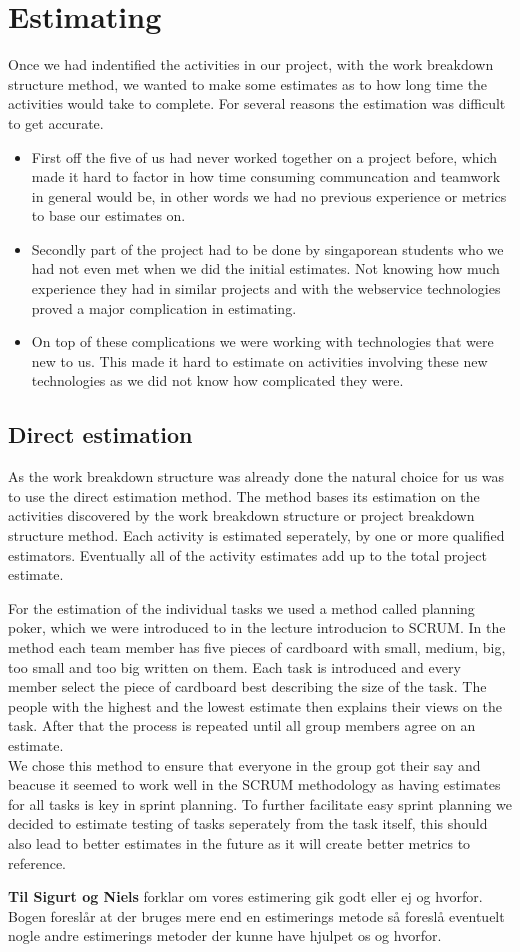 \section{Estimating}
Once we had indentified the activities in our project, with the work breakdown structure method, we wanted to make some estimates as to how long time the activities would take to complete. For several reasons the estimation was difficult to get accurate.
\begin{itemize}
\item First off the five of us had never worked together on a project before, which made it hard to factor in how time consuming communcation and teamwork in general would be, in other words we had no previous experience or metrics to base our estimates on. 

\item Secondly part of the project had to be done by singaporean students who we had not even met when we did the initial estimates. Not knowing how much experience they had in similar projects and with the webservice technologies proved a major complication in estimating.

\item  On top of these complications we were working with technologies that were new to us. This made it hard to estimate on activities involving these new technologies as we did not know how complicated they were.

\end{itemize}
\subsection{Direct estimation}
As the work breakdown structure was already done the natural choice for us was to use the direct estimation method\cite{caye}. The method bases its estimation on the activities discovered by the work breakdown structure or project breakdown structure method. Each activity is  estimated seperately, by one or more qualified estimators. Eventually all of the activity estimates add up to the total project estimate. 

For the estimation of the individual tasks we used a method called planning poker, which we were introduced to in the lecture introducion to SCRUM. In the method each team member has five pieces of cardboard with small, medium, big, too small and too big written on them. Each task is introduced and every member select the piece of cardboard best describing the size of the task. The people with the highest and the lowest estimate then explains their views on the task. After that the process is repeated until all group members agree on an estimate. \\
We chose this method to ensure that everyone in the group got their say and beacuse it seemed to work well in the SCRUM methodology as having estimates for all tasks is key in sprint planning. To further facilitate easy sprint planning we decided to estimate testing of tasks seperately from the task itself, this should also lead to better estimates in the future as it will create better metrics to reference.

\textbf{Til Sigurt og Niels}
forklar om vores estimering gik godt eller ej og hvorfor. Bogen foreslår at der bruges mere end en estimerings metode så foreslå eventuelt nogle andre estimerings metoder der kunne have hjulpet os og hvorfor.

